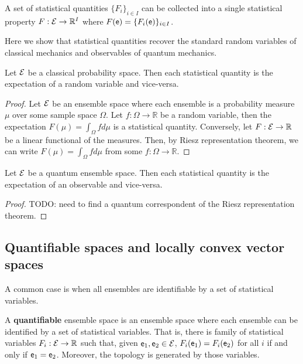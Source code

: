 \begin{coro}
	A set of statistical quantities $\{F_i\}_{i \in I}$ can be collected into a single statistical property $F : \mathcal{E} \to \mathbb{R}^I$ where $F(\mathsf{e}) = \{F_i(\mathsf{e})\}_{i \in I}$.
\end{coro}

Here we show that statistical quantities recover the standard random variables of classical mechanics and observables of quantum mechanics.

\begin{prop}
	Let $\mathcal{E}$ be a classical probability space. Then each statistical quantity is the expectation of a random variable and vice-versa.
\end{prop}

\begin{proof}
	Let $\mathcal{E}$ be an ensemble space where each ensemble is a probability measure $\mu$ over some sample space $\Omega$. Let $f : \Omega \to \mathbb{R}$ be a random variable, then the expectation $F(\mu) = \int_{\Omega} f d\mu$ is a statistical quantity. Conversely, let $F : \mathcal{E} \to \mathbb{R}$ be a linear functional of the measures. Then, by Riesz representation theorem, we can write $F(\mu) = \int_{\Omega} f d\mu$ from some $f : \Omega \to \mathbb{R}$.
\end{proof}

\begin{conj}
	Let $\mathcal{E}$ be a quantum ensemble space. Then each statistical quantity is the expectation of an observable and vice-versa.
\end{conj}

\begin{proof}
	TODO: need to find a quantum correspondent of the Riesz representation theorem.
\end{proof}

\subsection{Quantifiable spaces and locally convex vector spaces}

A common case is when all ensembles are identifiable by a set of statistical variables.

\begin{defn}
	A \textbf{quantifiable} ensemble space is an ensemble space where each ensemble can be identified by a set of statistical variables. That is, there is family of statistical variables $F_i : \mathcal{E} \to \mathbb{R}$ such that, given $\mathsf{e}_1, \mathsf{e}_2 \in \mathcal{E}$, $F_i(\mathsf{e}_1) = F_i(\mathsf{e}_2)$ for all $i$ if and only if $\mathsf{e}_1 = \mathsf{e}_2$. Moreover, the topology is generated by those variables.
\end{defn}

